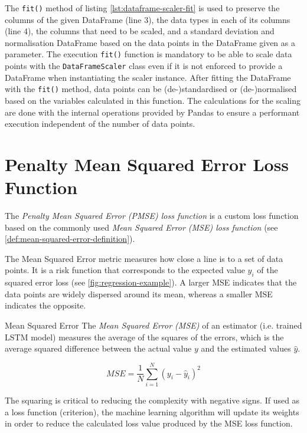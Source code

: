   
  The \texttt{fit()} method of listing \ref{lst:dataframe-scaler-fit} is used to preserve the columns of the given DataFrame (line 3), the data types in each of its columns (line 4), the columns that need to be scaled, and a standard deviation and normalisation DataFrame based on the data points in the DataFrame given as a parameter. The execution \texttt{fit()} function is mandatory to be able to scale data points with the \texttt{DataFrameScaler} class even if it is not enforced to provide a DataFrame when instantiating the scaler instance.
  After fitting the DataFrame with the \texttt{fit()} method, data points can be (de-)standardised or (de-)normalised based on the variables calculated in this function.
  The calculations for the scaling are done with the internal operations provided by Pandas to ensure a performant execution independent of the number of data points.


\section{Penalty Mean Squared Error Loss Function}
\label{sec:penalty-mse-loss-function-architecture-and-implementation}

  The \emph{Penalty Mean Squared Error (PMSE) loss function} is a custom loss function based on the commonly used \emph{Mean Squared Error (MSE) loss function} \cite{koksoyMultiresponseRobustDesign2006} (see \ref{def:mean-squared-error-definition}). 
  
  The Mean Squared Error metric measures how close a  line is to a set of data points. It is a risk function that corresponds to the expected value $y_i$ of the squared error loss (see \ref{fig:regression-example}). A larger MSE indicates that the data points are widely dispersed around its mean, whereas a smaller MSE indicates the opposite.

  \begin{pabox}{Mean Squared Error}
  \label{def:mean-squared-error-definition}
    The \emph{Mean Squared Error (MSE)} of an estimator (i.e. trained LSTM model) measures the average of the squares of the errors, which is the average squared difference between the actual value $y$ and the estimated values $\hat{y}$.

    $$MSE = \frac{1}{N} \sum_{i = 1}^{N}\left(y_i - \hat{y}_i\right)^2$$

    The squaring is critical to reducing the complexity with negative signs. If used as a loss function (criterion), the machine learning algorithm will update its weights in order to reduce the calculated loss value produced by the MSE loss function.
  \end{pabox}

